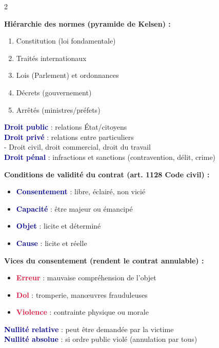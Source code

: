\documentclass[a4paper,10pt]{article}
\newcommand{\key}[1]{\textbf{\textcolor{darkblue}{#1}}}
\newcommand{\warn}[1]{\textbf{\textcolor{crimson}{#1}}}
\begin{document}
\begin{multicols}{2}
\begin{tcolorbox}[basebox, colframe=crimson, title=4. DROIT — Sources du droit]
\textbf{Hiérarchie des normes (pyramide de Kelsen) :}
\begin{enumerate}
  \item Constitution (loi fondamentale)
  \item Traités internationaux
  \item Lois (Parlement) et ordonnances
  \item Décrets (gouvernement)
  \item Arrêtés (ministres/préfets)
\end{enumerate}
\vspace{4pt}
\key{Droit public} : relations État/citoyens \\
\key{Droit privé} : relations entre particuliers \\
\quad - Droit civil, droit commercial, droit du travail \\[4pt]
\key{Droit pénal} : infractions et sanctions (contravention, délit, crime)
\end{tcolorbox}

\begin{tcolorbox}[basebox, colframe=crimson, title=5. DROIT — Formation du contrat]
\textbf{Conditions de validité du contrat (art. 1128 Code civil) :}
\begin{itemize}
  \item \key{Consentement} : libre, éclairé, non vicié
  \item \key{Capacité} : être majeur ou émancipé
  \item \key{Objet} : licite et déterminé
  \item \key{Cause} : licite et réelle
\end{itemize}
\vspace{4pt}
\textbf{Vices du consentement (rendent le contrat annulable) :}
\begin{itemize}
  \item \warn{Erreur} : mauvaise compréhension de l'objet
  \item \warn{Dol} : tromperie, manœuvres frauduleuses
  \item \warn{Violence} : contrainte physique ou morale
\end{itemize}
\vspace{4pt}
\key{Nullité relative} : peut être demandée par la victime \\
\key{Nullité absolue} : si ordre public violé (annulation par tous)
\end{tcolorbox}


\end{multicols}
\end{document}

